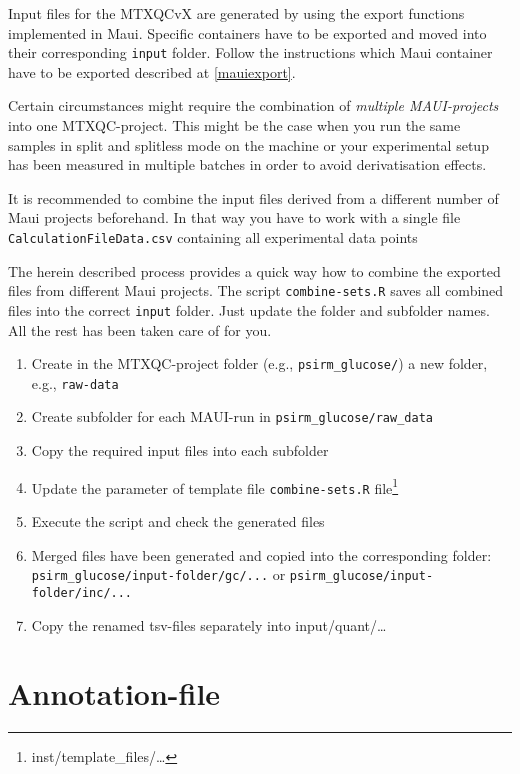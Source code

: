 \documentclass[]{book}
\providecommand{\tightlist}{%
  \setlength{\itemsep}{0pt}\setlength{\parskip}{0pt}}
\let\rmarkdownfootnote\footnote%
\def\footnote{\protect\rmarkdownfootnote}
\theoremstyle{definition}
\theoremstyle{definition}
\theoremstyle{definition}
\theoremstyle{remark}
\begin{document}
Input files for the MTXQCvX are generated by using the export functions
implemented in Maui. Specific containers have to be exported and moved
into their corresponding \texttt{input} folder. Follow the instructions
which Maui container have to be exported described at \ref{mauiexport}.

Certain circumstances might require the combination of \emph{multiple
MAUI-projects} into one MTXQC-project. This might be the case when you
run the same samples in split and splitless mode on the machine or your
experimental setup has been measured in multiple batches in order to
avoid derivatisation effects.

It is recommended to combine the input files derived from a different
number of Maui projects beforehand. In that way you have to work with a
single file \texttt{CalculationFileData.csv} containing all experimental
data points

The herein described process provides a quick way how to combine the
exported files from different Maui projects. The script
\texttt{combine-sets.R} saves all combined files into the correct
\texttt{input} folder. Just update the folder and subfolder names. All
the rest has been taken care of for you.

\begin{enumerate}
\def\labelenumi{\arabic{enumi}.}
\tightlist
\item
  Create in the MTXQC-project folder (e.g., \texttt{psirm\_glucose/}) a
  new folder, e.g., \texttt{raw-data}
\item
  Create subfolder for each MAUI-run in
  \texttt{psirm\_glucose/raw\_data}
\item
  Copy the required input files into each subfolder
\item
  Update the parameter of template file \texttt{combine-sets.R}
  file\footnote{inst/template\_files/\ldots{}}
\item
  Execute the script and check the generated files
\item
  Merged files have been generated and copied into the corresponding
  folder: \texttt{psirm\_glucose/input-folder/gc/...} or
  \texttt{psirm\_glucose/input-folder/inc/...}
\item
  Copy the renamed tsv-files separately into input/quant/\ldots{}
\end{enumerate}

\section{Annotation-file}\label{annotation-file}
\end{document}
